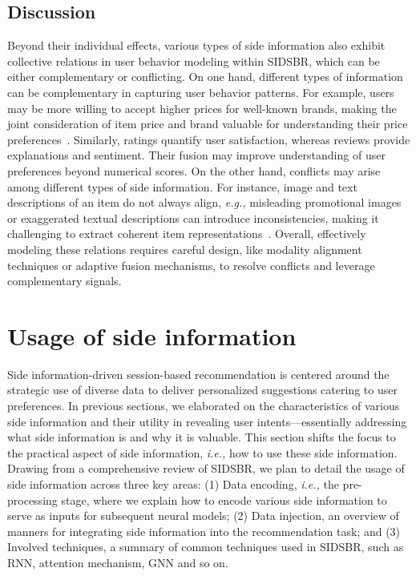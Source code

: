 \documentclass[lettersize,journal]{IEEEtran}
\newcommand{\ie}{\emph{i.e.,}\xspace}
\newcommand{\eg}{\emph{e.g.,}\xspace}
\newcommand{\baby}{{SIDSBR}\xspace}
\begin{document}
\subsection{Discussion}
Beyond their individual effects, various types of side information also exhibit collective relations in user behavior modeling within \baby, which can be either complementary or conflicting. On one hand, different types of information can be complementary in capturing user behavior patterns. For example, users may be more willing to accept higher prices for well-known brands, making the joint consideration of item price and brand valuable for understanding their price preferences~\cite{CoHHN, BiPNet}. Similarly, ratings quantify user satisfaction, whereas reviews provide explanations and sentiment. Their fusion may improve understanding of user preferences beyond numerical scores. On the other hand, conflicts may arise among different types of side information. For instance, image and text descriptions of an item do not always align, \eg misleading promotional images or exaggerated textual descriptions can introduce inconsistencies, making it challenging to extract coherent item representations~\cite{MMSBR}. Overall, effectively modeling these relations requires careful design, like modality alignment techniques or adaptive fusion mechanisms, to resolve conflicts and leverage complementary signals.

\section{Usage of side information}\label{Usage}

Side information-driven session-based recommendation is centered around the strategic use of diverse data to deliver personalized suggestions catering to user preferences. In previous sections, we elaborated on the characteristics of various side information and their utility in revealing user intents—essentially addressing what side information is and why it is valuable. This section shifts the focus to the practical aspect of side information, \ie how to use these side information. Drawing from a comprehensive review of \baby, we plan to detail the usage of side information across three key areas: (1) Data encoding, \ie the pre-processing stage, where we explain how to encode various side information to serve as inputs for subsequent neural models; (2) Data injection, an overview of manners for integrating side information into the recommendation task; and (3) Involved techniques, a summary of common techniques used in \baby, such as RNN, attention mechanism, GNN and so on.
\end{document}
